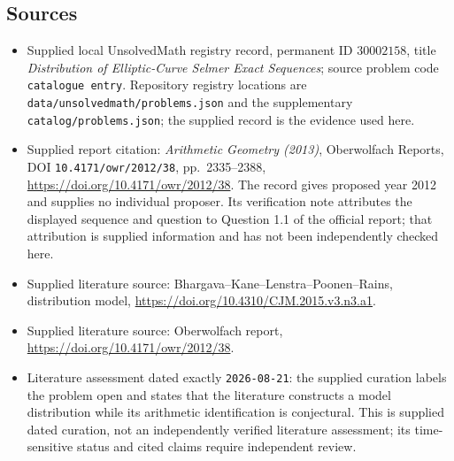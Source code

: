 \documentclass[11pt]{article}
\begin{document}
\subsection{Sources}
\begin{itemize}
\item Supplied local UnsolvedMath registry record, permanent ID \(30002158\), title \emph{Distribution of Elliptic-Curve Selmer Exact Sequences}; source problem code \texttt{catalogue entry}. Repository registry locations are \texttt{data/unsolvedmath/problems.json} and the supplementary \texttt{catalog/problems.json}; the supplied record is the evidence used here.
\item Supplied report citation: \emph{Arithmetic Geometry (2013)}, Oberwolfach Reports, DOI \texttt{10.4171/owr/2012/38}, pp.\ 2335--2388, \url{https://doi.org/10.4171/owr/2012/38}. The record gives proposed year 2012 and supplies no individual proposer. Its verification note attributes the displayed sequence and question to Question 1.1 of the official report; that attribution is supplied information and has not been independently checked here.
\item Supplied literature source: Bhargava--Kane--Lenstra--Poonen--Rains, distribution model, \url{https://doi.org/10.4310/CJM.2015.v3.n3.a1}.
\item Supplied literature source: Oberwolfach report, \url{https://doi.org/10.4171/owr/2012/38}.
\item Literature assessment dated exactly \texttt{2026-08-21}: the supplied curation labels the problem open and states that the literature constructs a model distribution while its arithmetic identification is conjectural. This is supplied dated curation, not an independently verified literature assessment; its time-sensitive status and cited claims require independent review.
\end{itemize}
\end{document}
